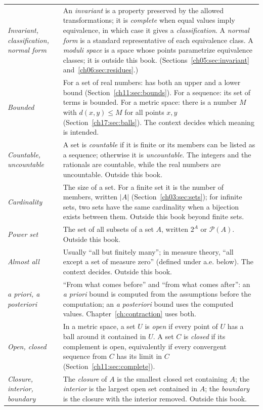 \begin{longtable}{@{}>{\raggedright\arraybackslash}p{1.35in}>{\raggedright\arraybackslash}p{3.85in}@{}}
\emph{Invariant, classification, normal form} & An \emph{invariant} is a property preserved by the allowed transformations; it is \emph{complete} when equal values imply equivalence, in which case it gives a \emph{classification}. A \emph{normal form} is a standard representative of each equivalence class. A \emph{moduli space} is a space whose points parametrize equivalence classes; it is outside this book. (Sections~\ref{ch05:sec:invariant} and~\ref{ch06:sec:residues}.)\\
\emph{Bounded} & For a set of real numbers: has both an upper and a lower bound (Section~\ref{ch11:sec:bounds}). For a sequence: its set of terms is bounded. For a metric space: there is a number $M$ with $d(x,y)\le M$ for all points $x,y$ (Section~\ref{ch17:sec:balls}). The context decides which meaning is intended.\\
\emph{Countable, uncountable} & A set is \emph{countable} if it is finite or its members can be listed as a sequence; otherwise it is \emph{uncountable}. The integers and the rationals are countable, while the real numbers are uncountable. Outside this book.\\
\emph{Cardinality} & The size of a set. For a finite set it is the number of members, written $|A|$ (Section~\ref{ch03:sec:sets}); for infinite sets, two sets have the same cardinality when a bijection exists between them. Outside this book beyond finite sets.\\
\emph{Power set} & The set of all subsets of a set $A$, written $2^A$ or $\mathcal P(A)$. Outside this book.\\
\emph{Almost all} & Usually ``all but finitely many''; in measure theory, ``all except a set of measure zero'' (defined under a.e. below). The context decides. Outside this book.\\
\emph{a priori, a posteriori} & ``From what comes before'' and ``from what comes after'': an \emph{a priori} bound is computed from the assumptions before the computation; an \emph{a posteriori} bound uses the computed values. Chapter~\ref{ch:contraction} uses both.\\
\emph{Open, closed} & In a metric space, a set $U$ is \emph{open} if every point of $U$ has a ball around it contained in $U$. A set $C$ is \emph{closed} if its complement is open, equivalently if every convergent sequence from $C$ has its limit in $C$ (Section~\ref{ch11:sec:complete}).\\
\emph{Closure, interior, boundary} & The \emph{closure} of $A$ is the smallest closed set containing $A$; the \emph{interior} is the largest open set contained in $A$; the \emph{boundary} is the closure with the interior removed. Outside this book.\\

\end{longtable}
